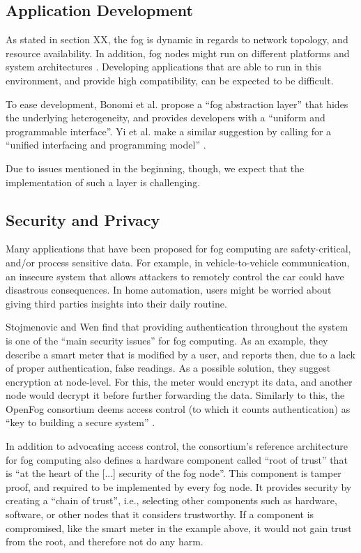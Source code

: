 \documentclass{article}
\begin{document}
\subsection{Application Development}
As stated in section XX, the fog is dynamic in regards to network topology, and resource availability. In addition, fog nodes might run on different platforms and system architectures \cite{yi2015survey}. Developing applications that are able to run in this environment, and provide high compatibility, can be expected to be difficult. 

To ease development, Bonomi et al. \cite{bonomi2014fog} propose a ``fog abstraction layer'' that hides the underlying heterogeneity, and provides developers with a ``uniform and programmable interface''. Yi et al. make a similar suggestion by calling for a ``unified interfacing and programming model'' \cite{yi2015survey}.

Due to issues mentioned in the beginning, though, we expect that the implementation of such a layer is challenging.


\subsection{Security and Privacy}
Many applications that have been proposed for fog computing are safety-critical, and/or process sensitive data. For example, in vehicle-to-vehicle communication, an insecure system that allows attackers to remotely control the car could have disastrous consequences. In home automation, users might be worried about giving third parties insights into their daily routine.

Stojmenovic and Wen \cite{stojmenovic2014fog} find that providing authentication throughout the system is one of the ``main security issues'' for fog computing. As an example, they describe a smart meter that is modified by a user, and reports then, due to a lack of proper authentication, false readings. As a possible solution, they suggest encryption at node-level. For this, the meter would encrypt its data, and another node would decrypt it before further forwarding the data. Similarly to this, the OpenFog consortium deems access control (to which it counts authentication) as ``key to building a secure system'' \cite{openfogconsortium2017}. 

In addition to advocating access control, the consortium's reference architecture for fog computing also defines a hardware component called ``root of trust'' that is ``at the heart of the [...] security of the fog node''. This component is tamper proof, and required to be implemented by every fog node. It provides security by creating a ``chain of trust'', i.e., selecting other components such as hardware, software, or other nodes that it considers trustworthy. If a component is compromised, like the smart meter in the example above, it would not gain trust from the root, and therefore not do any harm.
\end{document}
